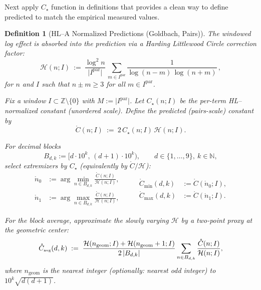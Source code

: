 \documentclass[11pt]{article}
\DeclarePairedDelimiter{\card}{\lvert}{\rvert}
\theoremstyle{inline}
\theoremstyle{break}
\theoremstyle{break}
\theoremstyle{break}
\theoremstyle{break}
\theoremstyle{break}
\theoremstyle{break}
\theoremstyle{break}
\newtheorem{definition}{Definition}
\theoremstyle{inline}
\newcommand{\tavg}{{\scriptscriptstyle\mathrm{avg}}}
\newcommand{\Cpred}{\mathring{C}}   %
\newcommand{\Npred}{\mathring{n}}   %
\newcommand{\Ipar}{I^{\mathrm{par}}}
\newcommand{\Ngeom}{n_\mathrm{geom}}
\newcommand{\HLCorr}{\mathcal{H}}
\begin{document}
Next apply \( C_\star \) function in definitions that provides a clean way to define predicted to match the empirical measured values.

\begin{definition}[HL–A Normalized Predictions (Goldbach, Pairs)]
The windowed log effect is absorbed into the prediction via a Harding Littlewood Circle correction factor:
\begin{equation}
\HLCorr(n;I)\ :=\ \frac{\log^2 n}{\lvert \Ipar\rvert}\,
\sum_{m\in \Ipar}\frac{1}{\log(n-m)\,\log(n+m)}\,,
\end{equation}
for \(n\) and \(I\) such that \(n\pm m\ge 3\) for all \(m\in\Ipar\).

Fix a window \(I\subset\mathbb Z\setminus\{0\}\) with \(M:=\lvert\Ipar\rvert\).
Let \(C_\star(n;I)\) be the per-term HL–normalized constant (unordered scale).
Define the \emph{predicted (pairs-scale) constant} by
\begin{equation}
\Cpred(n;I)\ :=\ 2\,C_\star(n;I)\,\HLCorr(n;I).
\end{equation}

For decimal blocks
\begin{equation}
B_{d,k}:=\big[d\cdot10^k,\,(d+1)\cdot10^k\big),\qquad d\in\{1,\dots,9\},\ k\in\mathbb N,
\end{equation}
select extremizers by \(C_\star\) (equivalently by \(\Cpred/\HLCorr\)):
\begin{equation}
\begin{aligned}
\Npred_0 &:= \arg\min_{n\in B_{d,k}} \frac{\Cpred(n;I)}{\HLCorr(n;I)}, \\
\Npred_1 &:= \arg\max_{n\in B_{d,k}} \frac{\Cpred(n;I)}{\HLCorr(n;I)},
\end{aligned}
\qquad
\begin{aligned}
\Cpred_{\min}(d,k) &:= \Cpred(\Npred_0;I),\\
\Cpred_{\max}(d,k) &:= \Cpred(\Npred_1;I).
\end{aligned}
\end{equation}

For the block average, approximate the slowly varying \(\HLCorr\) by a two-point
proxy at the geometric center:
\begin{equation}
\Cpred_{\tavg}(d,k)
\;:=\;
\frac{\HLCorr(\Ngeom;I)+\HLCorr(\Ngeom+1;I)}{2\,\card{B_{d,k}}}
\sum_{n\in B_{d,k}} \frac{\Cpred(n;I)}{\HLCorr(n;I)},
\end{equation}
where \(\Ngeom\) is the nearest integer (optionally: nearest \emph{odd} integer) to \(10^k\sqrt{d(d+1)}\).
\end{definition}
\end{document}
